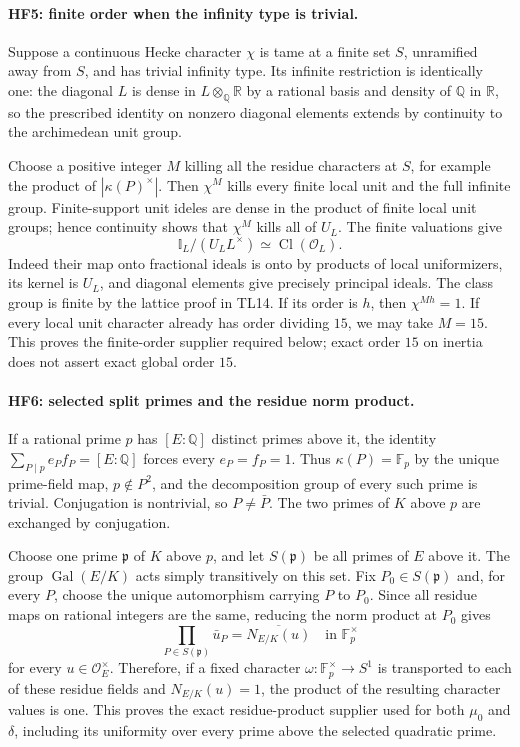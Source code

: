 \paragraph{HF5: finite order when the infinity type is trivial.}
Suppose a continuous Hecke character $\chi$ is tame at a
finite set $S$, unramified away from $S$, and has trivial
infinity type. Its infinite restriction is identically one:
the diagonal $L$ is dense in $L\otimes_{\mathbb Q}\mathbb R$
by a rational basis and density of $\mathbb Q$ in $\mathbb R$,
so the prescribed identity on nonzero diagonal elements
extends by continuity to the archimedean unit group.

Choose a positive integer $M$ killing all the residue
characters at $S$, for example the product of
$|\kappa(P)^\times|$. Then $\chi^M$ kills every finite
local unit and the full infinite group. Finite-support unit
ideles are dense in the product of finite local unit groups;
hence continuity shows that $\chi^M$ kills all of $U_L$.
The finite valuations give
\[
       \mathbb I_L/(U_L L^\times)\simeq
                                  \operatorname{Cl}(\mathcal O_L).
 \tag{HF.13}
\]
Indeed their map onto fractional ideals is onto by products
of local uniformizers, its kernel is $U_L$, and diagonal
elements give precisely principal ideals. The class group is
finite by the lattice proof in TL14. If its order is $h$, then
$\chi^{Mh}=1$. If every local unit character already has order
dividing $15$, we may take $M=15$.
This proves the finite-order supplier required below; exact
order $15$ on inertia does not assert exact global order $15$.

\paragraph{HF6: selected split primes and the residue norm product.}
If a rational prime $p$ has $[E:\mathbb Q]$ distinct primes
above it, the identity $\sum_{P\mid p}e_Pf_P=[E:\mathbb Q]$
forces every $e_P=f_P=1$. Thus
$\kappa(P)=\mathbb F_p$ by the unique prime-field map,
$p\notin P^2$, and the decomposition group of every such
prime is trivial. Conjugation is nontrivial, so
$P\ne\bar P$. The two primes of $K$ above $p$ are exchanged
by conjugation.

Choose one prime $\mathfrak p$ of $K$ above $p$, and let
$S(\mathfrak p)$ be all primes of $E$ above it.
The group $\operatorname{Gal}(E/K)$ acts simply transitively
on this set. Fix $P_0\in S(\mathfrak p)$ and, for every $P$,
choose the unique automorphism carrying $P$ to $P_0$.
Since all residue maps on rational integers are the same,
reducing the norm product at $P_0$ gives
\[
       \prod_{P\in S(\mathfrak p)}\bar u_P
                    =\overline{N_{E/K}(u)}
                       \quad\text{in }\mathbb F_p^\times
 \tag{HF.14}
\]
for every $u\in\mathcal O_E^\times$. Therefore, if a fixed
character $\omega:\mathbb F_p^\times\to S^1$ is transported
to each of these residue fields and $N_{E/K}(u)=1$,
the product of the resulting character values is one.
This proves the exact residue-product supplier used for both
$\mu_0$ and $\delta$, including its uniformity over every
prime above the selected quadratic prime.

